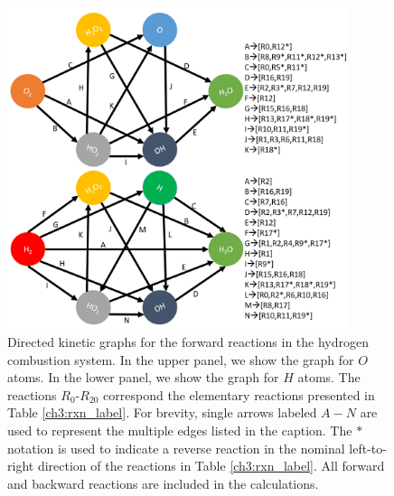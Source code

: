 \begin{figure}[htbp]
	\caption[Directed kinetic graphs for the forward reactions in the hydrogen combustion system]
	{Directed kinetic graphs for the forward reactions in the
hydrogen combustion system. In the upper panel, we show the graph
for $O$ atoms. In the lower panel, we show the graph for $H$ atoms. The
reactions $R_0$-$R_{20}$ correspond the elementary reactions presented in
Table \ref{ch3:rxn_label}. For brevity, single arrows labeled $A-N$ are used to represent
the multiple edges listed in the caption. The $\ast$ notation is used to
indicate a reverse reaction in the nominal left-to-right direction of the
reactions in Table \ref{ch3:rxn_label}. All forward and backward reactions are included
in the calculations.}
    \begin{center}
	\includegraphics[width=100mm]{figs/chapter4/fig4.png}
    \end{center}
\label{ch4:fig:4}
\end{figure}
\newline
